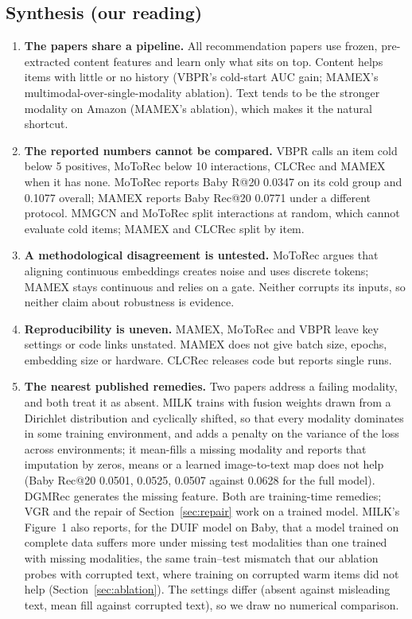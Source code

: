 \documentclass[conference]{IEEEtran}
\begin{document}
\subsection{Synthesis (our reading)}

\begin{enumerate}
\item \textbf{The papers share a pipeline.} All recommendation papers use frozen, pre-extracted content features and learn only what sits on top. Content helps items with little or no history (VBPR's cold-start AUC gain; MAMEX's multimodal-over-single-modality ablation). Text tends to be the stronger modality on Amazon (MAMEX's ablation), which makes it the natural shortcut.
\item \textbf{The reported numbers cannot be compared.} VBPR calls an item cold below 5 positives, MoToRec below 10 interactions, CLCRec and MAMEX when it has none. MoToRec reports Baby R@20 0.0347 on its cold group and 0.1077 overall; MAMEX reports Baby Rec@20 0.0771 under a different protocol. MMGCN and MoToRec split interactions at random, which cannot evaluate cold items; MAMEX and CLCRec split by item.
\item \textbf{A methodological disagreement is untested.} MoToRec argues that aligning continuous embeddings creates noise and uses discrete tokens; MAMEX stays continuous and relies on a gate. Neither corrupts its inputs, so neither claim about robustness is evidence.
\item \textbf{Reproducibility is uneven.} MAMEX, MoToRec and VBPR leave key settings or code links unstated. MAMEX does not give batch size, epochs, embedding size or hardware. CLCRec releases code but reports single runs.
\item \textbf{The nearest published remedies.} Two papers address a failing modality, and both treat it as absent. MILK trains with fusion weights drawn from a Dirichlet distribution and cyclically shifted, so that every modality dominates in some training environment, and adds a penalty on the variance of the loss across environments; it mean-fills a missing modality and reports that imputation by zeros, means or a learned image-to-text map does not help (Baby Rec@20 0.0501, 0.0525, 0.0507 against 0.0628 for the full model). DGMRec generates the missing feature. Both are training-time remedies; VGR and the repair of Section~\ref{sec:repair} work on a trained model. MILK's Figure~1 also reports, for the DUIF model on Baby, that a model trained on complete data suffers more under missing test modalities than one trained with missing modalities, the same train--test mismatch that our ablation probes with corrupted text, where training on corrupted warm items did not help (Section~\ref{sec:ablation}). The settings differ (absent against misleading text, mean fill against corrupted text), so we draw no numerical comparison.

\end{enumerate}
\end{document}

